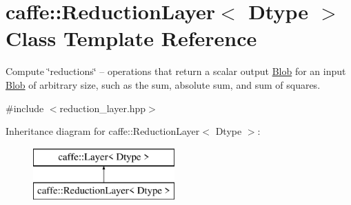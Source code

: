 \hypertarget{classcaffe_1_1ReductionLayer}{}\section{caffe\+:\+:Reduction\+Layer$<$ Dtype $>$ Class Template Reference}
\label{classcaffe_1_1ReductionLayer}


Compute \char`\"{}reductions\char`\"{} -- operations that return a scalar output \hyperlink{classcaffe_1_1Blob}{Blob} for an input \hyperlink{classcaffe_1_1Blob}{Blob} of arbitrary size, such as the sum, absolute sum, and sum of squares.  




{\ttfamily \#include $<$reduction\+\_\+layer.\+hpp$>$}

Inheritance diagram for caffe\+:\+:Reduction\+Layer$<$ Dtype $>$\+:\begin{figure}[H]
\begin{center}
\leavevmode
\includegraphics[height=2.000000cm]{classcaffe_1_1ReductionLayer}
\end{center}
\end{figure}
